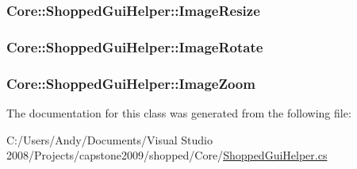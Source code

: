 \label{class_core_1_1_shopped_gui_helper_a0660a7dfee17722d87d891e667cc6bf6}
\hypertarget{class_core_1_1_shopped_gui_helper_acb483764bf793d2d52cc44e3c77cce4c}{
\subsubsection[{ImageResize}]{ Core::ShoppedGuiHelper::ImageResize}}
\label{class_core_1_1_shopped_gui_helper_acb483764bf793d2d52cc44e3c77cce4c}
\hypertarget{class_core_1_1_shopped_gui_helper_a5b4630078731e76cebeb2e0a6f613d33}{
\subsubsection[{ImageRotate}]{ Core::ShoppedGuiHelper::ImageRotate}}
\label{class_core_1_1_shopped_gui_helper_a5b4630078731e76cebeb2e0a6f613d33}
\hypertarget{class_core_1_1_shopped_gui_helper_a7353ed0ce33ce2af20c1c4f2b37bae0f}{
\subsubsection[{ImageZoom}]{ Core::ShoppedGuiHelper::ImageZoom}}
\label{class_core_1_1_shopped_gui_helper_a7353ed0ce33ce2af20c1c4f2b37bae0f}


The documentation for this class was generated from the following file:\begin{DoxyCompactItemize}
\item 
C:/Users/Andy/Documents/Visual Studio 2008/Projects/capstone2009/shopped/Core/\hyperlink{_shopped_gui_helper_8cs}{ShoppedGuiHelper.cs}\end{DoxyCompactItemize}

